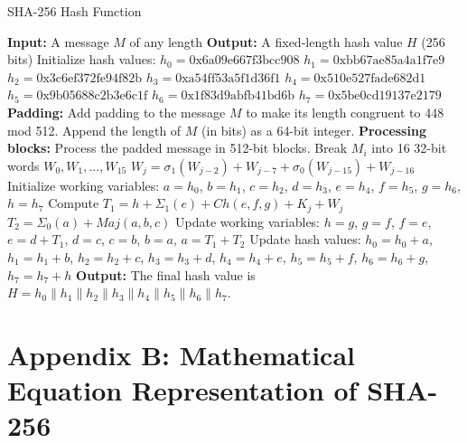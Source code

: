\begin{algorithm}
\caption{SHA-256 Hash Function}
\begin{algorithmic}
\State \textbf{Input:} A message \( M \) of any length
\State \textbf{Output:} A fixed-length hash value \( H \) (256 bits)
\State Initialize hash values:
\State \( h_0 = \text{0x6a09e667f3bcc908} \)
\State \( h_1 = \text{0xbb67ae85a4a1f7e9} \)
\State \( h_2 = \text{0x3c6ef372fe94f82b} \)
\State \( h_3 = \text{0xa54ff53a5f1d36f1} \)
\State \( h_4 = \text{0x510e527fade682d1} \)
\State \( h_5 = \text{0x9b05688c2b3e6c1f} \)
\State \( h_6 = \text{0x1f83d9abfb41bd6b} \)
\State \( h_7 = \text{0x5be0cd19137e2179} \)
\State \textbf{Padding:} Add padding to the message \( M \) to make its length congruent to 448 mod 512.
\State Append the length of \( M \) (in bits) as a 64-bit integer.
\State \textbf{Processing blocks:} Process the padded message in 512-bit blocks.
    \State Break \( M_i \) into 16 32-bit words \( W_0, W_1, ..., W_{15} \)
        \State \( W_j = \sigma_1(W_{j-2}) + W_{j-7} + \sigma_0(W_{j-15}) + W_{j-16} \)
    \EndFor
    \State Initialize working variables:
    \State \( a = h_0 \), \( b = h_1 \), \( c = h_2 \), \( d = h_3 \), \( e = h_4 \), \( f = h_5 \), \( g = h_6 \), \( h = h_7 \)
        \State Compute \( T_1 = h + \Sigma_1(e) + Ch(e,f,g) + K_j + W_j \)
        \State \( T_2 = \Sigma_0(a) + Maj(a,b,c) \)
        \State Update working variables:
        \State \( h = g \), \( g = f \), \( f = e \), \( e = d + T_1 \), \( d = c \), \( c = b \), \( b = a \), \( a = T_1 + T_2 \)
    \EndFor
    \State Update hash values:
    \State \( h_0 = h_0 + a \), \( h_1 = h_1 + b \), \( h_2 = h_2 + c \), \( h_3 = h_3 + d \), 
    \State \( h_4 = h_4 + e \), \( h_5 = h_5 + f \), \( h_6 = h_6 + g \), \( h_7 = h_7 + h \)
\EndFor
\State \textbf{Output:} The final hash value is \( H = h_0 \parallel h_1 \parallel h_2 \parallel h_3 \parallel h_4 \parallel h_5 \parallel h_6 \parallel h_7 \).
\end{algorithmic}
\end{algorithm}

\clearpage
\fancyhead[]{}
\fancyhead[LE,RO]{\thepage}
\section*{\centering Appendix B: Mathematical Equation Representation of SHA-256}

